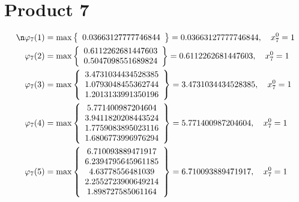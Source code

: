 \documentclass{article}
\begin{document}
\section{Product 7}
\begin{align*}
\n  
  
\varphi_{7}(1) &= \max \left\{ \begin{array}{c}
0.03663127777746844
\end{array} \right\} = 0.03663127777746844, \quad x_{7}^0 = 1\\
  
  
  
  
\varphi_{7}(2) &= \max \left\{ \begin{array}{c}
0.6112262681447603 \\
 0.5047098551689824
\end{array} \right\} = 0.6112262681447603, \quad x_{7}^0 = 1\\
  
  
  
  
\varphi_{7}(3) &= \max \left\{ \begin{array}{c}
3.4731034434528385 \\
 1.0793048455362744 \\
 1.2013133991350196
\end{array} \right\} = 3.4731034434528385, \quad x_{7}^0 = 1\\
  
  
  
  
\varphi_{7}(4) &= \max \left\{ \begin{array}{c}
5.771400987204604 \\
 3.9411820208443524 \\
 1.7759083895023116 \\
 1.6806773996976294
\end{array} \right\} = 5.771400987204604, \quad x_{7}^0 = 1\\
  
  
  
  
\varphi_{7}(5) &= \max \left\{ \begin{array}{c}
6.710093889471917 \\
 6.2394795645961185 \\
 4.63778556481039 \\
 2.2552723900649214 \\
 1.898727585061164
\end{array} \right\} = 6.710093889471917, \quad x_{7}^0 = 1\\
  
  
  

\end{align*}
\end{document}
